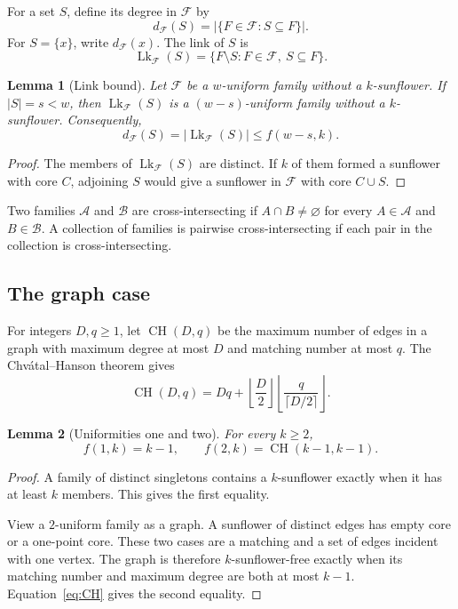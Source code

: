 \documentclass[11pt]{article}
\numberwithin{equation}{section}
\newtheorem{lemma}[lemma]{Lemma}
\theoremstyle{definition}
\theoremstyle{remark}
\newcommand{\F}{\mathcal F}
\newcommand{\CH}{\operatorname{CH}}
\newcommand{\Lk}{\operatorname{Lk}}
\begin{document}
For a set $S$, define its degree in $\F$ by
\[
 d_{\F}(S)=|\{F\in\F:S\subseteq F\}|.
\]
For $S=\{x\}$, write $d_{\F}(x)$. The link of $S$ is
\[
 \Lk_{\F}(S)=\{F\setminus S:F\in\F,\ S\subseteq F\}.
\]

\begin{lemma}[Link bound]
\label{lem:link-bound}
Let $\F$ be a $w$-uniform family without a $k$-sunflower. If
$|S|=s<w$, then $\Lk_{\F}(S)$ is a $(w-s)$-uniform family without a
$k$-sunflower. Consequently,
\begin{equation}
 d_{\F}(S)=|\Lk_{\F}(S)|\le f(w-s,k).
 \label{eq:link-bound}
\end{equation}
\end{lemma}

\begin{proof}
The members of $\Lk_{\F}(S)$ are distinct. If $k$ of them formed a
sunflower with core $C$, adjoining $S$ would give a sunflower in $\F$ with
core $C\cup S$.
\end{proof}

Two families $\mathcal A$ and $\mathcal B$ are cross-intersecting if
$A\cap B\ne\varnothing$ for every $A\in\mathcal A$ and
$B\in\mathcal B$. A collection of families is pairwise cross-intersecting if
each pair in the collection is cross-intersecting.

\subsection{The graph case}

For integers $D,q\ge1$, let $\CH(D,q)$ be the maximum number of edges in a
graph with maximum degree at most $D$ and matching number at most $q$. The
Chv\'atal--Hanson theorem \cite{ChvatalHanson1976} gives
\begin{equation}
 \CH(D,q)
 =Dq+\left\lfloor\frac D2\right\rfloor
      \left\lfloor\frac{q}{\lceil D/2\rceil}\right\rfloor.
 \label{eq:CH}
\end{equation}

\begin{lemma}[Uniformities one and two]
\label{lem:small-uniformities}
For every $k\ge2$,
\begin{equation}
 f(1,k)=k-1,
 \qquad
 f(2,k)=\CH(k-1,k-1).
 \label{eq:f1-f2}
\end{equation}
\end{lemma}

\begin{proof}
A family of distinct singletons contains a $k$-sunflower exactly when it has
at least $k$ members. This gives the first equality.

View a $2$-uniform family as a graph. A sunflower of distinct edges has empty
core or a one-point core. These two cases are a matching and a set of edges
incident with one vertex. The graph is therefore $k$-sunflower-free exactly
when its matching number and maximum degree are both at most $k-1$.
Equation~\eqref{eq:CH} gives the second equality.
\end{proof}
\end{document}
